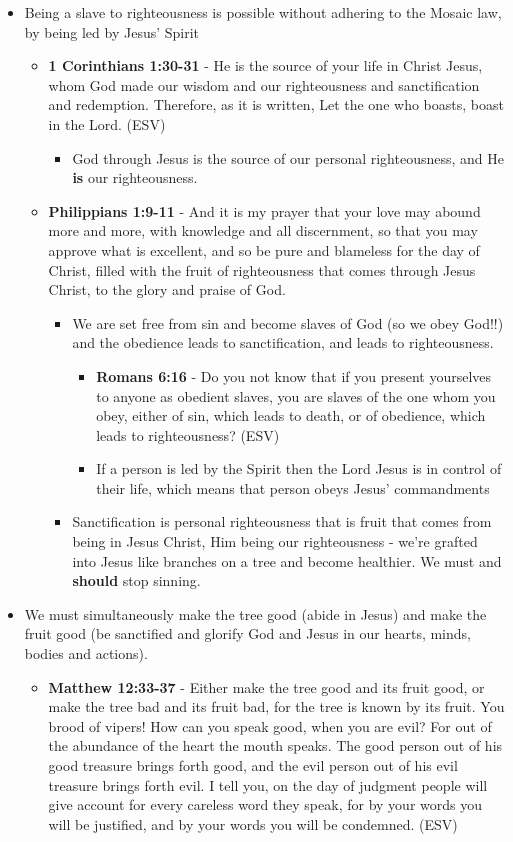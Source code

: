 \documentclass[11pt]{article}
\begin{document}
\begin{itemize}
\begin{itemize}
\item Being a slave to righteousness is possible without adhering to the Mosaic law, by being led by Jesus' Spirit
\begin{itemize}
\item \textbf{1 Corinthians 1:30-31} -  He is the source of your life in Christ Jesus, whom God made our wisdom and our righteousness and sanctification and redemption.  Therefore, as it is written, Let the one who boasts, boast in the Lord.  (ESV)
\begin{itemize}
\item God through Jesus is the source of our personal righteousness, and He \textbf{is} our righteousness.
\end{itemize}
\item \textbf{Philippians 1:9-11} - And it is my prayer that your love may abound more and more, with knowledge and all discernment, so that you may approve what is excellent, and so be pure and blameless for the day of Christ, filled with the fruit of righteousness that comes through Jesus Christ, to the glory and praise of God.
\begin{itemize}
\item We are set free from sin and become slaves of God (so we obey God!!) and the obedience leads to sanctification, and leads to righteousness.
\begin{itemize}
\item \textbf{Romans 6:16} - Do you not know that if you present yourselves to anyone as obedient slaves, you are slaves of the one whom you obey, either of sin, which leads to death, or of obedience, which leads to righteousness? (ESV)
\item If a person is led by the Spirit then the Lord Jesus is in control of their life, which means that person obeys Jesus' commandments
\end{itemize}
\item Sanctification is personal righteousness that is fruit that comes from being in Jesus Christ, Him being our righteousness - we're grafted into Jesus like branches on a tree and become healthier. We must and \textbf{should} stop sinning.
\end{itemize}
\end{itemize}
\item We must simultaneously make the tree good (abide in Jesus) and make the fruit good (be sanctified and glorify God and Jesus in our hearts, minds, bodies and actions).
\begin{itemize}
\item \textbf{Matthew 12:33-37} - Either make the tree good and its fruit good, or make the tree bad and its fruit bad, for the tree is known by its fruit. You brood of vipers! How can you speak good, when you are evil? For out of the abundance of the heart the mouth speaks. The good person out of his good treasure brings forth good, and the evil person out of his evil treasure brings forth evil. I tell you, on the day of judgment people will give account for every careless word they speak, for by your words you will be justified, and by your words you will be condemned. (ESV)

\end{itemize}
\end{itemize}
\end{itemize}
\end{document}

